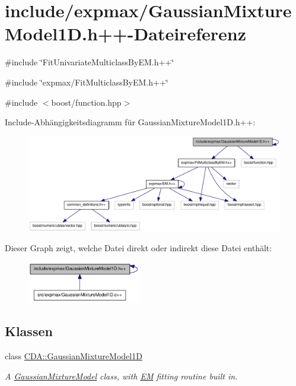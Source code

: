 \hypertarget{GaussianMixtureModel1D_8h_09_09}{
\section{include/expmax/GaussianMixtureModel1D.h++-\/Dateireferenz}
\label{GaussianMixtureModel1D_8h_09_09}
}
{\ttfamily \#include \char`\"{}FitUnivariateMulticlassByEM.h++\char`\"{}}\par
{\ttfamily \#include \char`\"{}expmax/FitMulticlassByEM.h++\char`\"{}}\par
{\ttfamily \#include $<$boost/function.hpp$>$}\par
Include-\/Abhängigkeitsdiagramm für GaussianMixtureModel1D.h++:\nopagebreak
\begin{figure}[H]
\begin{center}
\leavevmode
\includegraphics[width=365pt]{GaussianMixtureModel1D_8h_09_09__incl}
\end{center}
\end{figure}
Dieser Graph zeigt, welche Datei direkt oder indirekt diese Datei enthält:\nopagebreak
\begin{figure}[H]
\begin{center}
\leavevmode
\includegraphics[width=140pt]{GaussianMixtureModel1D_8h_09_09__dep__incl}
\end{center}
\end{figure}
\subsection*{Klassen}
\begin{DoxyCompactItemize}
\item 
class \hyperlink{classCDA_1_1GaussianMixtureModel1D}{CDA::GaussianMixtureModel1D}
\begin{DoxyCompactList}\small\item\em A \hyperlink{classCDA_1_1GaussianMixtureModel}{GaussianMixtureModel} class, with \hyperlink{classCDA_1_1EM}{EM} fitting routine built in. \item\end{DoxyCompactList}\end{DoxyCompactItemize}


